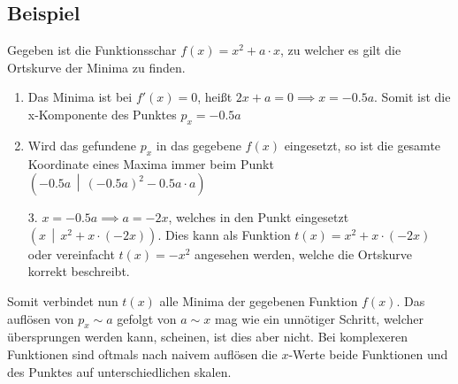 \documentclass{article}
\begin{document}
\subsection{Beispiel}
Gegeben ist die Funktionsschar $f(x)=x^2+a \cdot x$, zu welcher es gilt die Ortskurve der Minima zu finden. 
\begin{enumerate}
 \item Das Minima ist bei $f'(x)=0$, heißt $2x+a=0 \implies x=-0.5a$. Somit ist die x-Komponente des Punktes $p_x=-0.5a$
 \item Wird das gefundene $p_x$ in das gegebene $f(x)$ eingesetzt, so ist die gesamte Koordinate eines Maxima immer beim Punkt $\left(-0.5a \,\middle|\, \left(-0.5a\right)^2-0.5a \cdot a\right)$
\end{enumerate}
  
\noindent \begin{minipage}[t]{\dimexpr\textwidth-5cm} 
 \begin{enumerate} 
 \item[3.] $x = -0.5a \implies a = -2x$, welches in den Punkt eingesetzt $\left(x \,\middle|\, x^2+x \cdot \left(-2x\right)\right)$. Dies kann als Funktion $t(x)=x^2+x \cdot (-2x)$ oder vereinfacht $t(x)=-x^2$ angesehen werden, welche die Ortskurve korrekt beschreibt.
 \end{enumerate}
 Somit verbindet nun $t(x)$ alle Minima der gegebenen Funktion $f(x)$. \newline
 Das auflösen von $p_x \sim a$ gefolgt von $a \sim x$ mag wie ein unnötiger Schritt, welcher übersprungen werden kann, scheinen, ist dies aber nicht. Bei komplexeren Funktionen sind oftmals nach naivem auflösen die $x$-Werte beide Funktionen und des Punktes auf unterschiedlichen skalen.
\end{minipage} 
\hfill 
\begin{minipage}[t]{5cm} 
 \centering
\end{minipage} 
 
 
\end{document}
